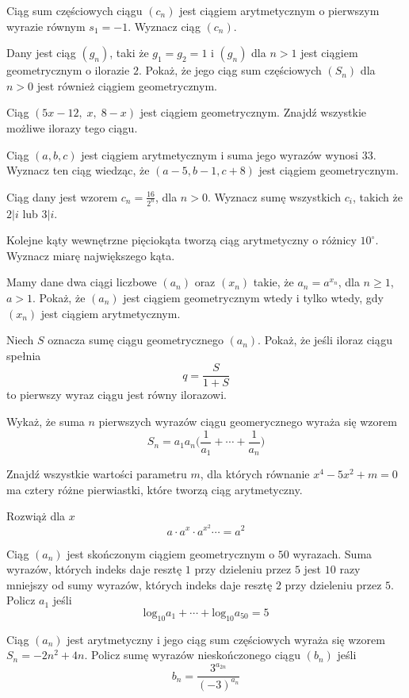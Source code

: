 \zadanie Ciąg sum częściowych ciągu $(c_n)$ jest ciągiem arytmetycznym o pierwszym wyrazie równym $s_1 = -1$. Wyznacz ciąg $(c_n)$.

\zadanie Dany jest ciąg $(g_n)$, taki że $g_1 = g_2 = 1$ i $(g_n)$ dla $n > 1$ jest ciągiem geometrycznym o ilorazie $2$. Pokaż, że jego ciąg sum częściowych $(S_n)$ dla $n > 0$ jest również ciągiem geometrycznym.

\zadanie Ciąg $(5x - 12,\;x,\;8 - x)$ jest ciągiem geometrycznym. Znajdź wszystkie możliwe ilorazy tego ciągu. %

\zadanie Ciąg $(a, b, c)$ jest ciągiem arytmetycznym i suma jego wyrazów wynosi $33$. Wyznacz ten ciąg wiedząc, że $(a - 5, b - 1, c + 8)$ jest ciągiem geometrycznym. 

\zadanie Ciąg dany jest wzorem $c_n = \frac{16}{2^n}$, dla $n > 0$. Wyznacz sumę wszystkich $c_i$, takich że $2|i$ lub $3|i$. %

\zadanie Kolejne kąty wewnętrzne pięciokąta tworzą ciąg arytmetyczny o różnicy $10^{\circ}$. Wyznacz miarę największego kąta. %

\zadanie Mamy dane dwa ciągi liczbowe $(a_n)$ oraz $(x_n)$ takie, że $a_n = a^{x_n}$, dla $n \geq 1$, $a > 1$. Pokaż, że $(a_n)$ jest ciągiem geometrycznym wtedy i tylko wtedy, gdy $(x_n)$ jest ciągiem arytmetycznym.

\zadanie Niech $S$ oznacza sumę ciągu geometrycznego $(a_n)$. Pokaż, że jeśli iloraz ciągu spełnia \[ q = \frac{S}{1 + S} \] to pierwszy wyraz ciągu jest równy ilorazowi.

\zadanie Wykaż, że suma $n$ pierwszych wyrazów ciągu geomerycznego wyraża się wzorem \[ S_n = a_1a_n\bigg(\frac{1}{a_1} + \cdots + \frac{1}{a_n}\bigg) \]

\zadanie Znajdź wszystkie wartości parametru $m$, dla których równanie $x^4 - 5x^2 + m = 0$ ma cztery różne pierwiastki, które tworzą ciąg arytmetyczny. %

\zadanie Rozwiąż dla $x$ \[a \cdot a^x \cdot a^{x^2} \cdots = a^2 \]

\zadanie Ciąg $(a_n)$ jest skończonym ciągiem geometrycznym o $50$ wyrazach. Suma wyrazów, których indeks daje resztę $1$ przy dzieleniu przez $5$ jest $10$ razy mniejszy od sumy wyrazów, których indeks daje resztę $2$ przy dzieleniu przez $5$. Policz $a_1$ jeśli \[ \text{log}_{10}a_1 + \cdots + \text{log}_{10}a_{50} = 5 \]

\zadanie Ciąg $(a_n)$ jest arytmetyczny i jego ciąg sum częściowych wyraża się wzorem $S_n = -2n^2 + 4n$. Policz sumę wyrazów nieskończonego ciągu $(b_n)$ jeśli \[ b_n = \dfrac{3^{a_{2n}}}{(-3)^{a_n}} \] %